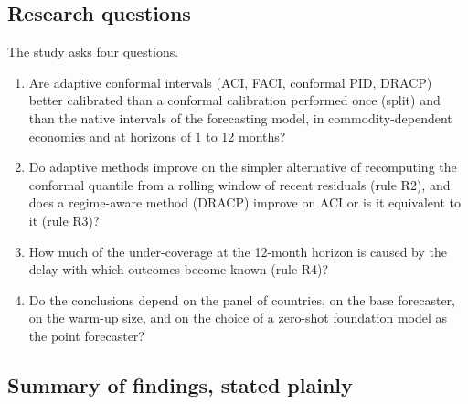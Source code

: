 \subsection{Research questions}

The study asks four questions.
\begin{enumerate}
\item[\textbf{RQ1}] Are adaptive conformal intervals (ACI, FACI, conformal PID, DRACP) better calibrated than a conformal calibration performed once (split) and than the native intervals of the forecasting model, in commodity-dependent economies and at horizons of 1 to 12 months?
\item[\textbf{RQ2}] Do adaptive methods improve on the simpler alternative of recomputing the conformal quantile from a rolling window of recent residuals (rule R2), and does a regime-aware method (DRACP) improve on ACI or is it equivalent to it (rule R3)?
\item[\textbf{RQ3}] How much of the under-coverage at the 12-month horizon is caused by the delay with which outcomes become known (rule R4)?
\item[\textbf{RQ4}] Do the conclusions depend on the panel of countries, on the base forecaster, on the warm-up size, and on the choice of a zero-shot foundation model as the point forecaster?
\end{enumerate}

\subsection{Summary of findings, stated plainly}

